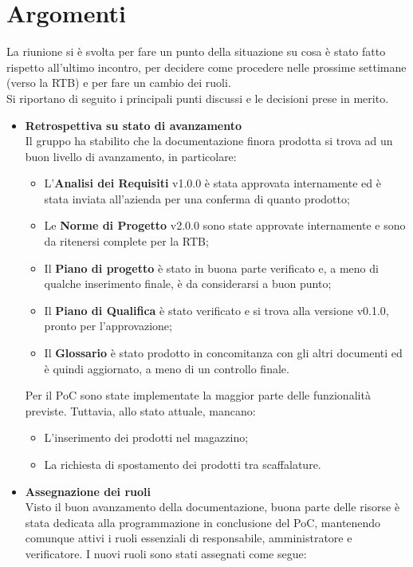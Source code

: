 \section{Argomenti} \label{sec:argomenti}
La riunione si è svolta per fare un punto della situazione su cosa è stato fatto rispetto all'ultimo incontro, per decidere come procedere nelle prossime settimane (verso la RTB) e per fare un cambio dei ruoli.
\\ \noindent Si riportano di seguito i principali punti discussi e le decisioni prese in merito.
    \begin{itemize}
        \item \textbf{Retrospettiva su stato di avanzamento} \\
        Il gruppo ha stabilito che la documentazione finora prodotta si trova ad un buon livello di avanzamento, in particolare:
        \begin{itemize}
            \item L'\textbf{Analisi dei Requisiti} v1.0.0 è stata approvata internamente ed è stata inviata all'azienda per una conferma di quanto prodotto;
            \item Le \textbf{Norme di Progetto} v2.0.0 sono state approvate internamente e sono da ritenersi complete per la RTB;
            \item Il \textbf{Piano di progetto} è stato in buona parte verificato e, a meno di qualche inserimento finale, è da considerarsi a buon punto;
            \item Il \textbf{Piano di Qualifica} è stato verificato e si trova alla versione v0.1.0, pronto per l'approvazione;
            \item Il \textbf{Glossario} è stato prodotto in concomitanza con gli altri documenti ed è quindi aggiornato, a meno di un controllo finale.
        \end{itemize}
        Per il PoC sono state implementate la maggior parte delle funzionalità previste. Tuttavia, allo stato attuale, mancano:
        \begin{itemize}
            \item L'inserimento dei prodotti nel magazzino;
            \item La richiesta di spostamento dei prodotti tra scaffalature.
        \end{itemize}        
        \item \textbf{Assegnazione dei ruoli} \\
        Visto il buon avanzamento della documentazione, buona parte delle risorse è stata dedicata alla programmazione in conclusione del PoC, mantenendo comunque attivi i ruoli essenziali di responsabile, amministratore e verificatore. I nuovi ruoli sono stati assegnati come segue:

\end{itemize}
